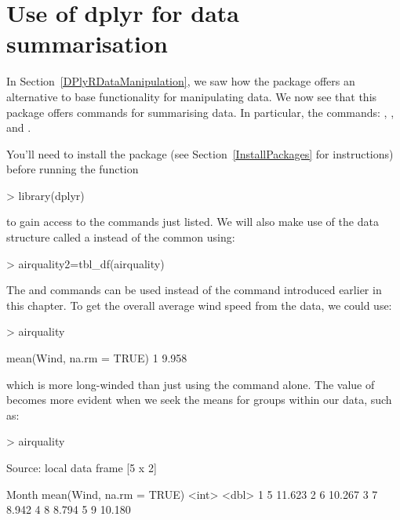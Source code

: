  
 
 
\section{Use of dplyr for data summarisation} 
\label{DPlyRDataSummarisation} 
 
 
In Section~\ref{DPlyRDataManipulation}, we saw how the  package offers an alternative to base \R{} functionality for manipulating data. We now see that this package offers commands for summarising data. In particular, the commands: , , and . 
   
You'll need to install the package (see Section~\ref{InstallPackages} for instructions) before running the function 
\begin{Schunk}
\begin{Sinput}
> library(dplyr) 
\end{Sinput}
\end{Schunk}
to gain access to the commands just listed. We will also make use of the  data structure called a  instead of the common  using: 
\begin{Schunk}
\begin{Sinput}
> airquality2=tbl_df(airquality) 
\end{Sinput}
\end{Schunk}
 
 
The   and  commands can be used instead of the  command introduced earlier in this chapter. To get the overall average wind speed from the  data, we could use: 
\begin{Schunk}
\begin{Sinput}
> airquality %>% summarise(mean(Wind, na.rm = TRUE)) 
\end{Sinput}
\begin{Soutput}
  mean(Wind, na.rm = TRUE)
1                    9.958
\end{Soutput}
\end{Schunk}
which is more long-winded than just using the  command alone. The value of  becomes more evident when we seek the means for groups within our data, such as: 
\begin{Schunk}
\begin{Sinput}
> airquality%>% group_by(Month) %>% summarise(mean(Wind, na.rm = TRUE)) 
\end{Sinput}
\begin{Soutput}
Source: local data frame [5 x 2]

  Month mean(Wind, na.rm = TRUE)
  <int>                    <dbl>
1     5                   11.623
2     6                   10.267
3     7                    8.942
4     8                    8.794
5     9                   10.180
\end{Soutput}
\end{Schunk}
 
